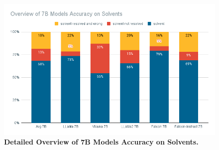 \begin{figure}[!htb]
    \begin{centering}
        \includegraphics[width=\textwidth]{img/overview_7b_solv}
        \caption[7B Models Detailed Solvent Accuracy]{\textbf{Detailed Overview of 7B Models Accuracy on Solvents.}
        }
        \label{fig:7b_solv}
    \end{centering}
\end{figure}
